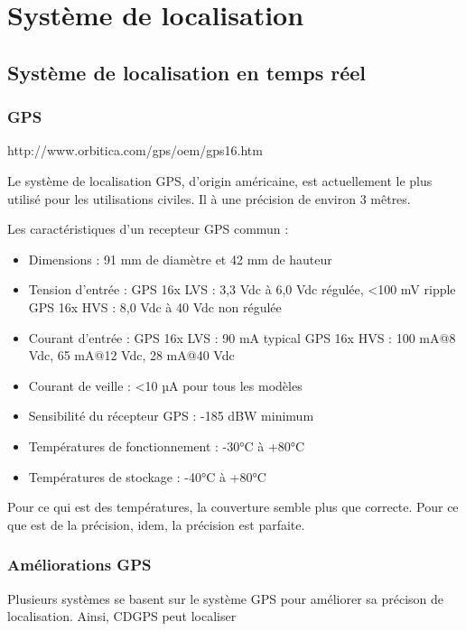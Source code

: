 \section{Système de localisation}

    \subsection{Système de localisation en temps réel}
        \subsubsection{GPS}
	        http://www.orbitica.com/gps/oem/gps16.htm

            Le système de localisation GPS, d'origin américaine, est actuellement le plus utilisé pour les utilisations civiles.
            Il à une précision de environ 3 mêtres.
            
            Les caractéristiques d'un recepteur GPS commun :
            \begin{itemize}
	            \item Dimensions : 91 mm de diamètre et 42 mm de hauteur

	            \item Tension d'entrée :
	                \subitem GPS 16x LVS : 3,3 Vdc à 6,0 Vdc régulée, <100 mV ripple
	                \subitem GPS 16x HVS : 8,0 Vdc à 40 Vdc non régulée
	            \item Courant d'entrée :
	                \subitem GPS 16x LVS : 90 mA typical
	                \subitem GPS 16x HVS : 100 mA@8 Vdc, 65 mA@12 Vdc, 28 mA@40 Vdc
	            \item Courant de veille : <10 µA pour tous les modèles
	            \item Sensibilité du récepteur GPS : -185 dBW minimum

	            \item Températures de fonctionnement : -30°C à +80°C
	            \item Températures de stockage : -40°C à +80°C
            \end{itemize}

	        Pour ce qui est des températures, la couverture semble plus que correcte.
	        Pour ce que est de la précision, idem, la précision est parfaite.
	        
	    \subsubsection{Améliorations GPS}
	        Plusieurs systèmes se basent sur le système GPS pour améliorer sa précison de localisation.
	        Ainsi, CDGPS peut localiser



